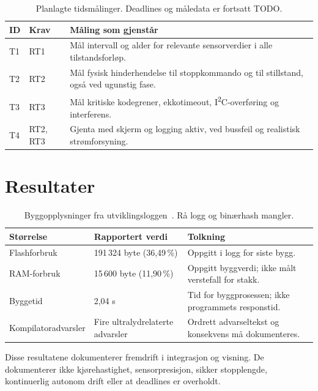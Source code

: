 \documentclass[a4paper,11pt,oneside]{report}
\begin{document}
\begin{table}[htbp]
\small
\begin{tabularx}{\textwidth}{@{}P{10mm}P{18mm}Y@{}}
\toprule ID & Krav & Måling som gjenstår\\\midrule
T1 & RT1 & Mål intervall og alder for relevante sensorverdier i alle tilstandsforløp.\\
T2 & RT2 & Mål fysisk hinderhendelse til stoppkommando og til stillstand, også ved ugunstig fase.\\
T3 & RT3 & Mål kritiske kodegrener, ekkotimeout, I\textsuperscript{2}C-overføring og interferens.\\
T4 & RT2, RT3 & Gjenta med skjerm og logging aktiv, ved bussfeil og realistisk strømforsyning.\\
\bottomrule
\end{tabularx}
\caption{Planlagte tidsmålinger. Deadlines og måledata er fortsatt TODO.}
\end{table}

\section{Resultater}
\begin{table}[!ht]
\small
\begin{tabularx}{\textwidth}{@{}YP{38mm}P{49mm}@{}}
\toprule Størrelse & Rapportert verdi & Tolkning\\\midrule
Flashforbruk & 191\,324 byte (36,49\,\%) & Oppgitt i logg for siste bygg.\\
RAM-forbruk & 15\,600 byte (11,90\,\%) & Oppgitt byggverdi; ikke målt verstefall for stakk.\\
Byggetid & 2,04 s & Tid for byggprosessen; ikke programmets responstid.\\
Kompilatoradvarsler & Fire ultralydrelaterte advarsler & Ordrett advarseltekst og konsekvens må dokumenteres.\\
\bottomrule
\end{tabularx}
\caption{Byggopplysninger fra utviklingsloggen~\cite{logg}. Rå logg og binærhash mangler.}
\label{tab:bygg}
\end{table}

Disse resultatene dokumenterer fremdrift i integrasjon og visning.
De dokumenterer ikke kjørehastighet, sensorpresisjon, sikker stopplengde,
kontinuerlig autonom drift eller at deadlines er overholdt.





\end{document}
